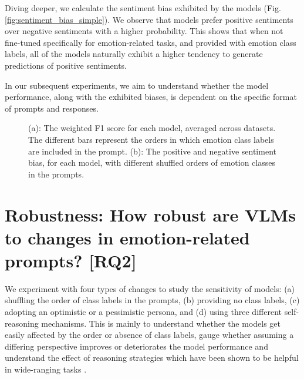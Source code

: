 Diving deeper, we calculate the sentiment bias exhibited by the models (Fig. \ref{fig:sentiment_bias_simple}). We observe that models prefer positive sentiments over negative sentiments with a higher probability. This shows that when not fine-tuned specifically for emotion-related tasks, and provided with emotion class labels, all of the models naturally exhibit a higher tendency to generate predictions of positive sentiments. 

In our subsequent experiments, we aim to understand whether the model performance, along with the exhibited biases, is dependent on the specific format of prompts and responses. 

\begin{figure*}
    \centering
    \hfill
    \caption{(a): The weighted F1 score for each model, averaged across datasets. The different bars represent the orders in which emotion class labels are included in the prompt. (b): The positive and negative sentiment bias, for each model, with different shuffled orders of emotion classes in the prompts.}
\end{figure*}

\section{Robustness: How robust are VLMs to changes in emotion-related prompts? [RQ2]}
\label{sec:exp_rq2}

We experiment with four types of changes to study the sensitivity of models: (a) shuffling the order of class labels in the prompts, (b) providing no class labels, (c) adopting an optimistic or a pessimistic persona, and (d) using three different self-reasoning mechanisms. This is mainly to understand whether the models get easily affected by the order or absence of class labels, gauge whether assuming a differing perspective improves or deteriorates the model performance and understand the effect of reasoning strategies which have been shown to be helpful in wide-ranging tasks \cite{wei2022chain, li2024enhancing}. 

